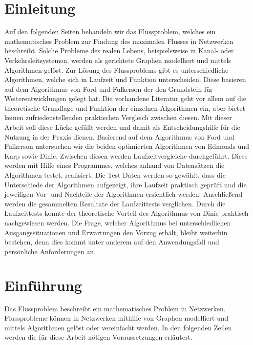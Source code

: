 \documentclass[a4paper]{llncs}
\begin{document}
\section{Einleitung}
\label{Einleitung}

Auf den folgenden Seiten behandeln wir das Flussproblem, welches ein mathematisches Problem zur Findung des maximalen Flusses in Netzwerken beschreibt.
 Solche Probleme des realen Lebens, beispielsweise in Kanal- oder Verkehrsleitsystemen, werden als gerichtete Graphen modelliert und mittels Algorithmen gelöst.
 Zur Lösung des Flussproblems gibt es unterschiedliche Algorithmen, welche sich in Laufzeit und Funktion unterscheiden. Diese basieren auf dem Algorithmus von Ford und Fulkerson der den Grundstein für Weiterentwicklungen gelegt hat.
 Die vorhandene Literatur geht vor allem auf die theoretische Grundlage und Funktion der einzelnen Algorithmen ein,  aber bietet keinen zufriedenstellenden praktischen Vergleich zwischen diesen.
 Mit dieser Arbeit soll diese Lücke gefüllt werden und damit als Entscheidungshilfe für die Nutzung in der Praxis dienen.
Basierend auf dem Algorithmus von Ford und Fulkerson untersuchen wir die beiden optimierten Algorithmen von Edmonds und Karp sowie Dinic.
Zwischen diesen werden Laufzeitvergleiche durchgeführt.
Diese werden mit Hilfe eines Programmes, welches anhand von Datensätzen die Algorithmen testet, realisiert.
Die Test Daten werden so gewählt, dass die Unterschiede der Algorithmen aufgezeigt, ihre Laufzeit praktisch geprüft und die jeweiligen Vor- und Nachteile der Algorithmen ersichtlich werden. Anschließend werden die gesammelten Resultate der Laufzeittests verglichen.
Durch die Laufzeittests konnte der theoretische Vorteil des Algorithmus von Dinic praktisch nachgewiesen werden.
 Die Frage, welcher Algorithmus bei unterschiedlichen Ausgangssituationen und Erwartungen den Vorzug erhält, bleibt weiterhin bestehen, denn dies kommt unter anderem auf den Anwendungsfall und persönliche Anforderungen an.

\section{Einführung}
\label{Einfuehrung}

Das Flussproblem beschreibt ein mathematisches Problem in Netzwerken.\\
Flussprobleme können in Netzwerken mithilfe von Graphen modelliert und mittels Algorithmen gelöst oder vereinfacht werden. In den folgenden Zeilen werden die für diese Arbeit nötigen Voraussetzungen erläutert.
\end{document}
